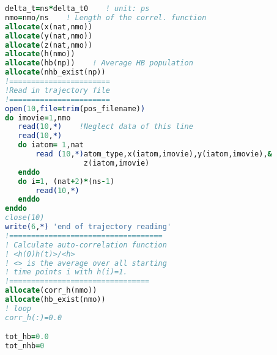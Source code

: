 \begin{lstlisting}[language=fortran]
delta_t=ns*delta_t0    ! unit: ps
nmo=nmo/ns    ! Length of the correl. function
allocate(x(nat,nmo))
allocate(y(nat,nmo))
allocate(z(nat,nmo))
allocate(h(nmo))
allocate(hb(np))    ! Average HB population
allocate(nhb_exist(np))
!=======================
!Read in trajectory file
!=======================
open(10,file=trim(pos_filename))
do imovie=1,nmo
   read(10,*)    !Neglect data of this line
   read(10,*)
   do iatom= 1,nat
       read (10,*)atom_type,x(iatom,imovie),y(iatom,imovie),&
                  z(iatom,imovie)
   enddo
   do i=1, (nat+2)*(ns-1)
       read(10,*)
   enddo
enddo
close(10)
write(6,*) 'end of trajectory reading'
!===================================
! Calculate auto-correlation function
! <h(0)h(t)>/<h>
! <> is the average over all starting 
! time points i with h(i)=1.
!================================
allocate(corr_h(nmo))
allocate(hb_exist(nmo))
! loop
corr_h(:)=0.0

tot_hb=0.0
tot_nhb=0


\end{lstlisting}
